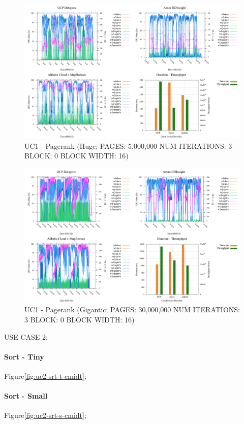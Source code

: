 \documentclass[review]{elsarticle}
\begin{document}
\begin{figure}[b]
	\caption{UC1 - Pagerank (Huge; PAGES: 5,000,000 NUM ITERATIONS: 3 BLOCK: 0 BLOCK WIDTH: 16)}
	\label{fig:uc1-page-h-cmidt}
	\includegraphics[width=\textwidth]{uc1-page-h-cmidt}
	\centering
\end{figure}

\begin{figure}[b]
	\caption{UC1 - Pagerank (Gigantic; PAGES: 30,000,000 NUM ITERATIONS: 3 BLOCK: 0 BLOCK WIDTH: 16)}
	\label{fig:uc1-page-g-cmidt}
	\includegraphics[width=\textwidth]{uc1-page-g-cmidt}
	\centering
\end{figure}

USE CASE 2: 

\paragraph{Sort - Tiny} Figure\ref{fig:uc2-srt-t-cmidt}; 
\paragraph{Sort - Small} Figure\ref{fig:uc2-srt-s-cmidt}; 
\end{document}
